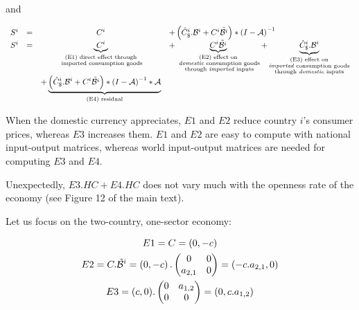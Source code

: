 \documentclass[11pt,a4paper]{article} %
\begin{document}
and

\begin{equation}
\begin{array}{lccl}
S^ i&=&C^i	&+ \left(\hat{C}^i_\$.{\cal B}^i+{C^i}{\tilde{{\cal B}^i}}\right)*{{(I-{\cal A})}^{-1}} \\
S^i &=&\underbrace{C^i}_{\substack{\text{(E1) direct effect through} \\ \text{ imported consumption goods}}}&+ \underbrace{{C^i}{\tilde{{\cal B}^i}}}_{\substack{\text{(E2) effect on} \\ \text{ \emph{domestic} consumption goods} \\ \text{ through \emph{imported} inputs}}}  + \underbrace{\hat{C}^i_\$.{\cal B}^i}_{\substack{\text{(E3)  effect on} \\ \text{\emph{imported} consumption goods} \\ \text{through \emph{domestic} inputs}}} \\ &&+\underbrace {\left( \hat{C}^i_\$.{\cal B}^i + {C^i}{\tilde{{\cal B}^i}}\right)*{{(I-{\cal A})}^{-1}}*{\cal A}}_{\text{(E4) residual}} \\
\end{array}
\end{equation}



When the domestic currency appreciates, $E1$ and $E2$ reduce country $i$'s consumer prices, whereas $E3$ increases them. $E1$ and $E2$ are easy to compute with national input-output matrices, whereas world input-output matrices are needed for computing $E3$ and $E4$.

Unexpectedly, $E3.HC + E4.HC$ does not vary much with the openness rate of the economy (see Figure 12 of the main text).


Let us focus on the two-country, one-sector economy: 

\begin{gather*}
E1=C=\left(0,-c\right)
\\
E2=C.\tilde{\cal B}^i=\left(0,-c\right).\left(\begin{matrix}0&0\\a_{2,1}&0\end{matrix}\right)=\left(-c.a_{2,1},0\right)
\\
E3=(c,0).\left(\begin{matrix}0&a_{1,2}\\0&0\end{matrix}\right)=\left(0,c.a_{1,2}\right)
\end{gather*}
\end{document}
